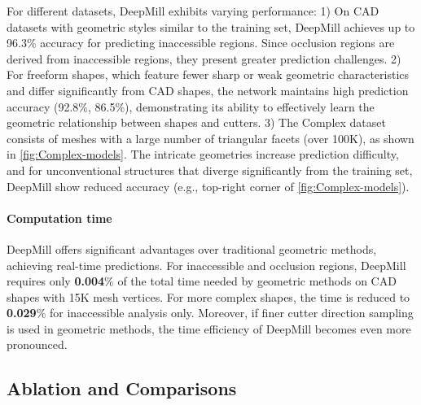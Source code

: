 

For different datasets, DeepMill exhibits varying performance:
1) On CAD datasets with geometric styles similar to the training set, DeepMill achieves up to 96.3$\%$ accuracy for predicting inaccessible regions. Since occlusion regions are derived from inaccessible regions, they present greater prediction challenges.
2) For freeform shapes, which feature fewer sharp or weak geometric characteristics and differ significantly from CAD shapes, the network maintains high prediction accuracy (92.8$\%$, 86.5$\%$), demonstrating its ability to effectively learn the geometric relationship between shapes and cutters.
3) The Complex dataset consists of meshes with a large number of triangular facets (over 100K), as shown in \autoref{fig:Complex-models}. The intricate geometries increase prediction difficulty, and for unconventional structures that diverge significantly from the training set, DeepMill show reduced accuracy (e.g., top-right corner of \autoref{fig:Complex-models}).




\paragraph{Computation time}
DeepMill offers significant advantages over traditional geometric methods, achieving real-time predictions. For inaccessible and occlusion regions, DeepMill requires only \textbf{0.004$\%$} of the total time needed by geometric methods on CAD shapes with 15K mesh vertices. For more complex shapes, the time is reduced to \textbf{0.029$\%$} for inaccessible analysis only. Moreover, if finer cutter direction sampling is used in geometric methods, the time efficiency of DeepMill becomes even more pronounced.



\subsection{Ablation and Comparisons}


